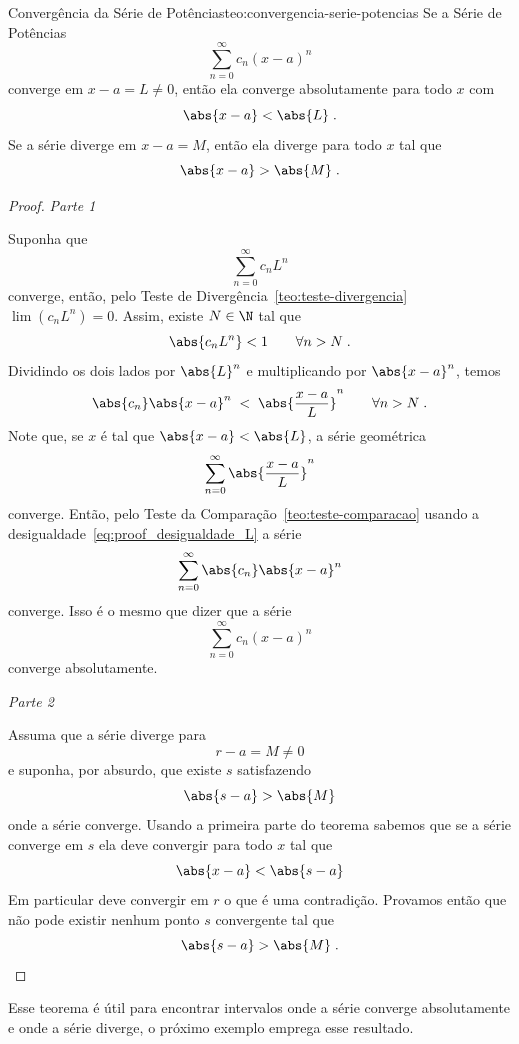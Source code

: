 \begin{teorema}{Convergência da Série de Potências}{teo:convergencia-serie-potencias}
  Se a Série de Potências
  \[
  	\sum_{n=0}^\infty c_n(x-a)^n
 	\]
  converge em $x-a=L\neq 0$, então ela converge absolutamente para todo $x$ com
  \[
  	\abs{x-a}<\abs{L}   \;.
  \]
  Se a série diverge em $x-a=M$, então ela diverge para todo $x$ tal que
  \[
  	\abs{x-a}>\abs{M}   \;.
  \]
\end{teorema}
\begin{proof}
  \emph{Parte 1}

  Suponha que
  \[
  	\sum_{n=0}^\infty c_n L^n
 	\]
  converge, então, pelo Teste de Divergência~\ref{teo:teste-divergencia}
  \( \lim (c_n L^n) = 0 \).
  Assim, existe $N\in\N$ tal que
  \[
  	\abs{ c_n L^n } < 1 \qquad \forall n > N \;.
 	\]
 	Dividindo os dois lados por $\abs{L}^n$ e multiplicando por $\abs{x-a}^n$, temos
  \begin{equation}
    \label{eq:proof_desigualdade_L}
  	\abs{c_n}\abs{x-a}^n \;<\; \abs{\frac{x-a}{L}}^n \qquad \forall n>N   \;.
  \end{equation}
  Note que, se $x$ é tal que $\abs{x-a} < \abs{L}$, a série geométrica
  \[
    \sum_{n=0}^\infty \abs{\frac{x-a}{L}}^n
  \]
  converge.
  Então, pelo Teste da Comparação~\ref{teo:teste-comparacao}
  usando a desigualdade~\eqref{eq:proof_desigualdade_L}
  a série
  \[
  	\sum_{n=0}^\infty \abs{c_n}\abs{x-a}^n
  \]
  converge. Isso é o mesmo que dizer que a série
  \[
  	\sum_{n=0}^\infty c_n(x-a)^n
  \]
  converge absolutamente.

  \emph{Parte 2}

  Assuma que a série diverge para
  \[
    r - a = M \neq 0
  \]
  e suponha, por absurdo, que existe $s$ satisfazendo
  \[
    \abs{s-a} > \abs{M}
  \]
  onde a série converge.
  Usando a primeira parte do teorema sabemos que se a série converge em $s$
  ela deve convergir para todo $x$ tal que
  \[
    \abs{x-a} < \abs{s-a}
  \]
  Em particular deve convergir em $r$ o que é uma contradição.
  Provamos então que não pode existir nenhum ponto $s$ convergente
  tal que
  \[
    \abs{s-a} > \abs{M} \;.
  \]
\end{proof}

Esse teorema é útil para encontrar intervalos onde a série converge
absolutamente e onde a série diverge, o próximo exemplo emprega esse resultado.

